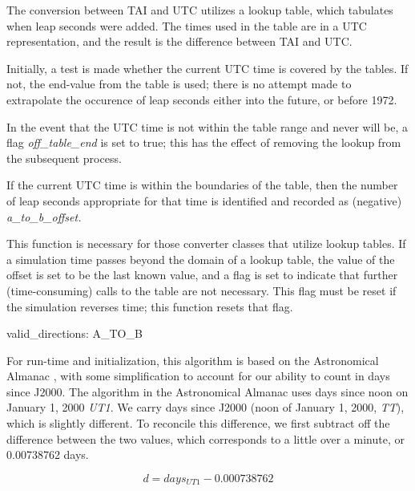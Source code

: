 {\begin{enumerate}
{\begin{enumerate}
The conversion between TAI and UTC utilizes a lookup table, which
tabulates when leap seconds were added.  The times used in the table
are in a UTC representation, and the result is the difference between
TAI and UTC.  

Initially, a test is made whether the current UTC time is covered by the
tables.  If not, the end-value from the table is used; there is no attempt made
to extrapolate the occurence of leap seconds either into the future, or before
1972.

In the event that the UTC time is not within the table range and never will 
be, a flag
\textit{off\_table\_end} is set to true; this has the effect of
removing the lookup from the subsequent process.  

If the current UTC time is within the boundaries of the table, then the
number of leap seconds appropriate for that time is identified and
recorded as (negative) \textit{a\_to\_b\_offset.}

This function is necessary for those converter classes that utilize
lookup tables.  If a simulation time passes beyond the domain of a
lookup table, the value of the offset is set to be the last known
value, and a flag is set to indicate that further (time-consuming)
calls to the table are not necessary.  This flag must be reset if the
simulation reverses time; this function resets that flag.

\end{enumerate}}




{\begin{enumerate}
valid\_directions:
A\_TO\_B

For run-time and initialization, this algorithm is based on the
Astronomical Almanac \cite{timebib:AstronomicalAlmanac}, 
with some simplification to account for our
ability to count in days since J2000.  The algorithm in the
Astronomical Almanac uses days since noon on January 1, 2000
\textit{UT1}.  We carry days since J2000 (noon of January 1, 2000,
\textit{TT}), which is slightly different.  To reconcile this
difference, we first subtract off the difference between the two
values, which corresponds to a little over a minute, or 0.00738762
days.

\begin{equation*}
d=days_{UT1}-0.000738762
\end{equation*}


\end{enumerate}}
\end{enumerate}}
